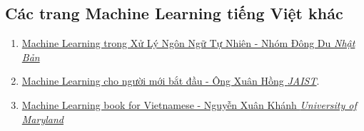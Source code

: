 \subsection{Các trang Machine Learning tiếng Việt khác}
\begin{enumerate}
	\item \href{http://viet.jnlp.org/kien-thuc-co-ban-ve-xu-ly-ngon-ngu-tu-nhien/machine-learning-trong-nlp}{Machine Learning trong Xử Lý Ngôn Ngữ Tự Nhiên - Nhóm Đông Du {\it Nhật Bản}}

	\item \href{https://ongxuanhong.wordpress.com/}{Machine Learning cho người mới bắt đầu - Ông Xuân Hồng {\it JAIST}}. 

	
	 \item \href{https://ml-book-vn.khanhxnguyen.com/}{Machine Learning book for Vietnamese - Nguyễn Xuân Khánh \textit{University of Maryland}}
\end{enumerate}
